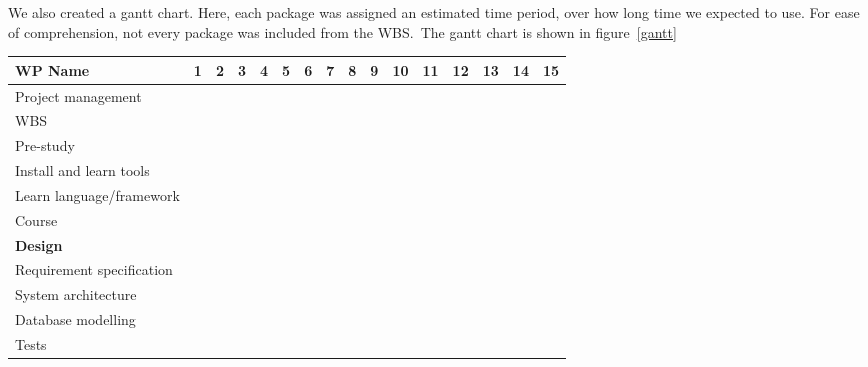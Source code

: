 We also created a gantt chart. Here, each package was assigned an
estimated time period, over how long time we expected to use. For ease
of comprehension, not every package was included from the WBS.\ The
gantt chart is shown in figure~\ref{gantt}
\begin{tabular}{|l|l|l|l|l|l|l|l|l|l|l|l|l|l|l|l|}
\hline
\textbf{WP Name} & 1 & 2 & 3 & 4 & 5 & 6 & 7 & 8 & 9 & 10 & 11 & 12 & 13 & 14 & 15 \\
\hline
Project management & \cellcolor{ForestGreen} &\cellcolor{ForestGreen}&\cellcolor{ForestGreen}&\cellcolor{ForestGreen}&\cellcolor{ForestGreen}&\cellcolor{ForestGreen}&\cellcolor{ForestGreen}&\cellcolor{ForestGreen}&\cellcolor{ForestGreen}&\cellcolor{ForestGreen}&\cellcolor{ForestGreen}&\cellcolor{ForestGreen}&\cellcolor{ForestGreen}&\cellcolor{ForestGreen}&\cellcolor{ForestGreen} \\
\hline
WBS &&&&&&&&&&&&&&& \\
\hline
Pre-study
&\cellcolor{yellow}&\cellcolor{yellow}&\cellcolor{yellow}&\cellcolor{yellow}&&&&&&&&&&&
\\ \hline
Install and learn tools&\cellcolor{Dandelion}&\cellcolor{Dandelion}&\cellcolor{Dandelion}&\cellcolor{Dandelion}&&&&&&&&&&& \\
\hline
Learn language/framework&&\cellcolor{Dandelion}&\cellcolor{Dandelion}&\cellcolor{Dandelion}&&&&&&&&&&&  \\
\hline
Course &&\cellcolor{Dandelion}&\cellcolor{Dandelion}&&&&&&&&&&&&  \\
\hline
\textbf{Design} & &\cellcolor{MidnightBlue} &\cellcolor{MidnightBlue} &\cellcolor{MidnightBlue} &\cellcolor{MidnightBlue} &\cellcolor{MidnightBlue} &\cellcolor{MidnightBlue} &\cellcolor{MidnightBlue} &\cellcolor{MidnightBlue} &\cellcolor{MidnightBlue} & & & & & \\ \hline
Requirement specification&&\cellcolor{RoyalBlue}&\cellcolor{RoyalBlue}&\cellcolor{RoyalBlue}&\cellcolor{RoyalBlue}&\cellcolor{RoyalBlue}&\cellcolor{RoyalBlue}&\cellcolor{RoyalBlue}&\cellcolor{RoyalBlue}&\cellcolor{RoyalBlue}&&&&&  \\
\hline
System architecture&&&\cellcolor{RoyalBlue}&\cellcolor{RoyalBlue}&\cellcolor{RoyalBlue}&\cellcolor{RoyalBlue}&\cellcolor{RoyalBlue}&&&&&&&&  \\
\hline
Database modelling&&&\cellcolor{RoyalBlue}&\cellcolor{RoyalBlue}&\cellcolor{RoyalBlue}&\cellcolor{RoyalBlue}&&&&&&&&&  \\
\hline
Tests &&&\cellcolor{RoyalBlue}&\cellcolor{RoyalBlue}&\cellcolor{RoyalBlue}&\cellcolor{RoyalBlue}&&&&&&&&&  \\

\end{tabular}

